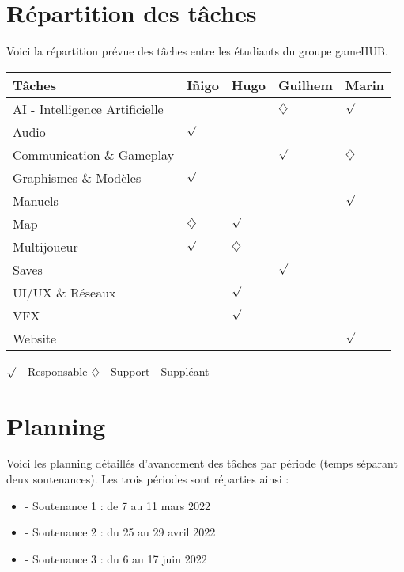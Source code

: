 \section{Répartition des tâches}
\noindent Voici la répartition prévue des tâches entre les étudiants du groupe gameHUB.


\begin{center}
\begin{tabular}{|l|l|l|l|l|}
\hline
Tâches                         & Iñigo & Hugo        & Guilhem & Marin \\ \hline
AI - Intelligence Artificielle &       &             & $\diamondsuit$        & $\surd$  \\ \hline
Audio                          & $\surd$  &             &         &       \\ \hline
Communication \& Gameplay                       &       &             & $\surd$    & $\diamondsuit$      \\ \hline
Graphismes \& Modèles          & $\surd$  &             &         &       \\ \hline
Manuels                        &       &             &         & $\surd$  \\ \hline
Map                            & $\diamondsuit$ & $\surd$        &         &       \\ \hline
Multijoueur                    & $\surd$  & $\diamondsuit$ &         &       \\ \hline
Saves                          &       &             & $\surd$    &       \\ \hline
UI/UX \& Réseaux             &       & $\surd$        &         &       \\ \hline
VFX                            &       & $\surd$        &         &       \\ \hline
Website                        &       &  &         & $\surd$  \\ \hline
\end{tabular}
\end{center}

\noindent $\surd$ - Responsable
\newline
$\diamondsuit$ - Support - Suppléant

\section{Planning}

\noindent Voici les planning détaillés d’avancement des tâches par période (temps séparant deux soutenances). Les trois périodes sont réparties ainsi :
\begin{itemize}
    \item - Soutenance 1 : de 7 au 11 mars 2022
    \item - Soutenance 2 : du 25 au 29 avril 2022
    \item - Soutenance 3 : du 6 au 17 juin 2022
\end{itemize}

